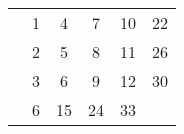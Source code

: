 \documentclass{article}
\begin{document}
\begin{tabular}{|c|c|c|c|c|c|}\hline
 & & & & & \\
\hline
 & 1 & 4 & 7 & 10 & 22\\
\hline
 & 2 & 5 & 8 & 11 & 26\\
\hline
 & 3 & 6 & 9 & 12 & 30\\
\hline
 & 6 & 15 & 24 & 33 & \\
\hline
\end{tabular}
\end{document}
